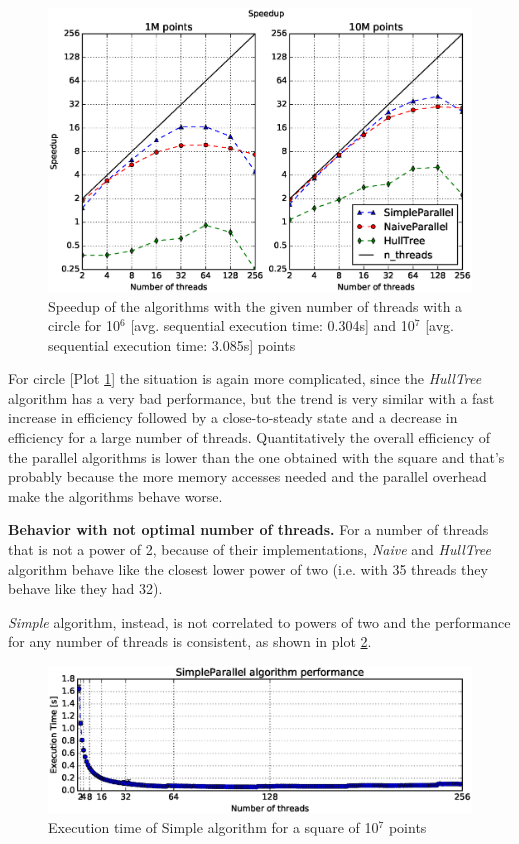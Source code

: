 \documentclass[letterpaper]{article}
\newcommand{\mypar}[1]{{\bf #1.}}
\theoremstyle{definition}
\begin{document}
\begin{figure}[!ht]\centering
  \includegraphics[scale=0.33]{./plots/speedup_xeon_circle_fixed_points.eps}
  \caption{Speedup of the algorithms with the given number of threads with a circle for 10$^6$ [avg. sequential execution time: 0.304s] and 10$^7$ [avg. sequential execution time: 3.085s] points\label{Threads speedup circle}}
\end{figure}

For circle [Plot \ref{Threads speedup circle}] the situation is again more complicated, since the \textit{HullTree} algorithm has a very bad performance, but the trend is very similar with a fast increase in efficiency followed by a close-to-steady state and a decrease in efficiency for a large number of threads.
Quantitatively the overall efficiency of the parallel algorithms is lower than the one obtained with the square and that's probably because the more memory accesses needed and the parallel overhead make the algorithms behave worse.

\mypar{Behavior with not optimal number of threads}
For a number of threads that is not a power of 2, because of their implementations, \textit{Naive} and \textit{HullTree} algorithm behave like the closest lower power of two (i.e. with 35 threads they behave like they had 32).

\textit{Simple} algorithm, instead, is not correlated to powers of two and the performance for any number of threads is consistent, as shown in plot \ref{SimpleParallel Total}.

\begin{figure}[!ht]\centering
  \includegraphics[scale=0.33]{./plots/total.eps}
  \caption{Execution time of Simple algorithm for a square of 10$^7$ points\label{SimpleParallel Total}}
\end{figure}
\end{document}
